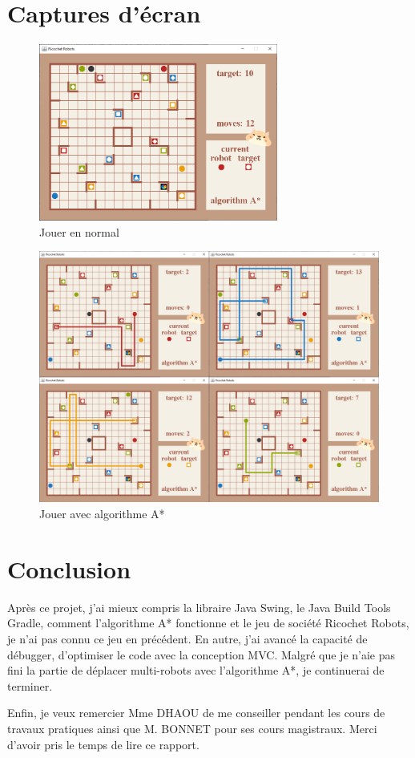 \documentclass[12pt, pdflatex]{article}
\begin{document}
\pagebreak

\section{Captures d'écran}
\begin{figure}[H]
    \centering
    \includegraphics[width=0.7\textwidth]{sources/cap-2.png}
    \caption{Jouer en normal}
\end{figure}

\begin{figure}[H]
    \centering
    \includegraphics[width=1\textwidth]{sources/cap-algo.pdf}
    \caption{Jouer avec algorithme A*}
\end{figure}

\pagebreak

\section{Conclusion}
Après ce projet, j'ai mieux compris la libraire Java Swing, le Java Build Tools Gradle, comment l'algorithme A* fonctionne et le jeu de société Ricochet Robots, je n'ai pas connu ce jeu en précédent. En autre, j'ai avancé la capacité de débugger, d'optimiser le code avec la conception MVC. Malgré que je n'aie pas fini la partie de déplacer multi-robots avec l'algorithme A*, je continuerai de terminer.

Enfin, je veux remercier Mme DHAOU de me conseiller pendant les cours de travaux pratiques ainsi que M. BONNET pour ses cours magistraux. Merci d'avoir pris le temps de lire ce rapport.

\pagebreak



\end{document}
